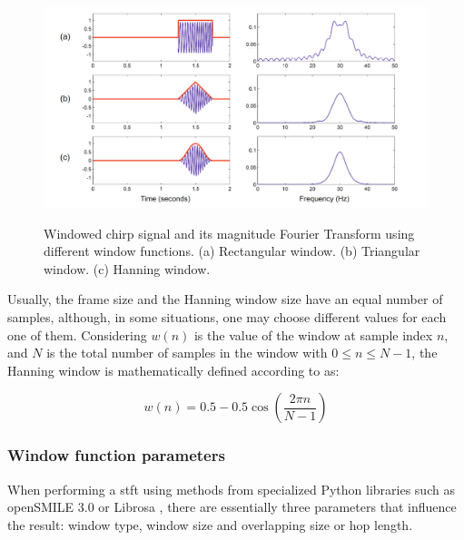 \begin{figure}[htbp]
    \raggedright
        \caption{Windowed chirp signal and its magnitude Fourier Transform using different window functions. (a) Rectangular window. (b) Triangular window. (c) Hanning window.}
        \includegraphics[width=1.0\textwidth]{resources/images/030-theoretical_framework/Framework_windows_stft_examples.png}
        \label{fig:frmwk_windows_stft_example}
\end{figure}

Usually, the frame size and the Hanning window size have an equal number of samples, although, in some situations, one may choose different values for each one of them. Considering $w(n)$ is the value of the window at sample index $n$, and $N$ is the total number of samples in the window with $0 \leq n \leq N-1$, the Hanning window is mathematically defined according to \textcite{Smith2013} as:

\begin{equation}
    \label{eq:frmwk_windows_stft}
    w(n) = 0.5 - 0.5 \cos\left(\frac{2 \pi n}{N-1}\right)
\end{equation}


\subsubsection{Window function parameters}
\label{subsubsec:audio_fundamentals_window_function_parameters}

When performing a \gls{stft} using methods from specialized Python libraries such as openSMILE 3.0 \cite{Eyben2010} or  Librosa \cite{McFee2015librosa_conf}, there are essentially three parameters that influence the result: window type, window size and overlapping size or hop length.

